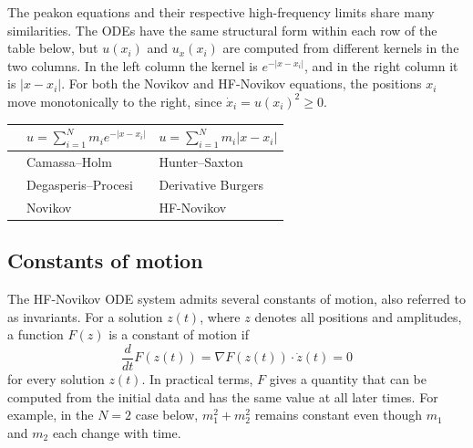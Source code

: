 \documentclass[english,master]{liumaiex}
\theoremstyle{thesisplain}
\theoremstyle{thesisdefinition}
\numberwithin{equation}{section}
\begin{document}
The peakon equations and their respective high-frequency limits share many similarities. The ODEs have the same structural form within each row of the table below, but $u(x_i)$ and $u_x(x_i)$ are computed from different kernels in the two columns. In the left column the kernel is $e^{-|x-x_i|}$, and in the right column it is $|x-x_i|$. For both the Novikov and HF-Novikov equations, the positions $x_i$ move monotonically to the right, since $\dot{x}_i=u(x_i)^2\ge0$.
\begin{center}
  \begin{tabular}{l|c|c}
    & $u=\sum_{i=1}^N m_i e^{-|x-x_i|}$ & $u=\sum_{i=1}^N m_i |x-x_i|$ \\[3pt]
    \hline
    \makecell[l]{
	$\begin{aligned}
		\dot{x}_i &= u(x_i),\\
		\dot{m}_i &= -\phantom{2}m_i u_x(x_i)
	\end{aligned}$}
	& \multicolumn{1}{l|}{Camassa--Holm} & \multicolumn{1}{l}{Hunter--Saxton} \\
    \hline
    \makecell[l]{
	$\begin{aligned}
		\dot{x}_i &= u(x_i),\\
		\dot{m}_i &= -2m_i u_x(x_i)
	\end{aligned}$}
	& \multicolumn{1}{l|}{Degasperis--Procesi} & \multicolumn{1}{l}{Derivative Burgers} \\
    \hline
    \makecell[l]{
	$\begin{aligned}
		\dot{x}_i &= u(x_i)^2,\\
		\dot{m}_i &= -\phantom{2}m_i u_x(x_i) u(x_i)
	\end{aligned}$}
	& \multicolumn{1}{l|}{Novikov} & \multicolumn{1}{l}{HF-Novikov} \\
  \end{tabular}
\end{center}

\subsection{Constants of motion}

The HF-Novikov ODE system admits several constants of motion, also referred to as invariants. For a solution $z(t)$, where $z$ denotes all positions and amplitudes, a function $F(z)$ is a constant of motion if
\[
	\frac{d}{dt}F(z(t))=\nabla F(z(t))\cdot \dot z(t)=0
\]
for every solution $z(t)$. In practical terms, $F$ gives a quantity that can be computed from the initial data and has the same value at all later times. For example, in the $N=2$ case below, $m_1^2+m_2^2$ remains constant even though $m_1$ and $m_2$ each change with time.
\end{document}
